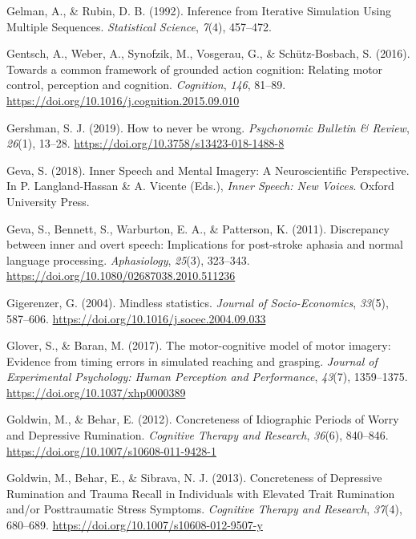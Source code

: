 \documentclass[a4paper,12pt,twoside,openright,oldfontcommands,final]{memoir}
\begin{document}
\leavevmode\hypertarget{ref-gelman_inference_1992}{}%
Gelman, A., \& Rubin, D. B. (1992). Inference from Iterative Simulation Using Multiple Sequences. \emph{Statistical Science}, \emph{7}(4), 457--472.

\leavevmode\hypertarget{ref-gentsch_towards_2016}{}%
Gentsch, A., Weber, A., Synofzik, M., Vosgerau, G., \& Schütz-Bosbach, S. (2016). Towards a common framework of grounded action cognition: Relating motor control, perception and cognition. \emph{Cognition}, \emph{146}, 81--89. \url{https://doi.org/10.1016/j.cognition.2015.09.010}

\leavevmode\hypertarget{ref-gershman_how_2019}{}%
Gershman, S. J. (2019). How to never be wrong. \emph{Psychonomic Bulletin \& Review}, \emph{26}(1), 13--28. \url{https://doi.org/10.3758/s13423-018-1488-8}

\leavevmode\hypertarget{ref-geva_inner_2018}{}%
Geva, S. (2018). Inner Speech and Mental Imagery: A Neuroscientific Perspective. In P. Langland-Hassan \& A. Vicente (Eds.), \emph{Inner Speech: New Voices}. Oxford University Press.

\leavevmode\hypertarget{ref-geva_discrepancy_2011}{}%
Geva, S., Bennett, S., Warburton, E. A., \& Patterson, K. (2011). Discrepancy between inner and overt speech: Implications for post-stroke aphasia and normal language processing. \emph{Aphasiology}, \emph{25}(3), 323--343. \url{https://doi.org/10.1080/02687038.2010.511236}

\leavevmode\hypertarget{ref-Gigerenzer2004}{}%
Gigerenzer, G. (2004). Mindless statistics. \emph{Journal of Socio-Economics}, \emph{33}(5), 587--606. \url{https://doi.org/10.1016/j.socec.2004.09.033}

\leavevmode\hypertarget{ref-glover_motor-cognitive_2017}{}%
Glover, S., \& Baran, M. (2017). The motor-cognitive model of motor imagery: Evidence from timing errors in simulated reaching and grasping. \emph{Journal of Experimental Psychology: Human Perception and Performance}, \emph{43}(7), 1359--1375. \url{https://doi.org/10.1037/xhp0000389}

\leavevmode\hypertarget{ref-goldwin_concreteness_2012}{}%
Goldwin, M., \& Behar, E. (2012). Concreteness of Idiographic Periods of Worry and Depressive Rumination. \emph{Cognitive Therapy and Research}, \emph{36}(6), 840--846. \url{https://doi.org/10.1007/s10608-011-9428-1}

\leavevmode\hypertarget{ref-goldwin_concreteness_2013}{}%
Goldwin, M., Behar, E., \& Sibrava, N. J. (2013). Concreteness of Depressive Rumination and Trauma Recall in Individuals with Elevated Trait Rumination and/or Posttraumatic Stress Symptoms. \emph{Cognitive Therapy and Research}, \emph{37}(4), 680--689. \url{https://doi.org/10.1007/s10608-012-9507-y}
\end{document}
